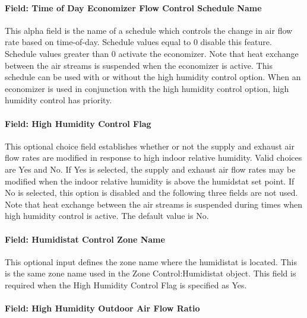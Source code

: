 \paragraph{Field: Time of Day Economizer Flow Control Schedule Name}\label{field-time-of-day-economizer-flow-control-schedule-name}

This alpha field is the name of a schedule which controls the change in air flow rate based on time-of-day. Schedule values equal to 0 disable this feature. Schedule values greater than 0 activate the economizer. Note that heat exchange between the air streams is suspended when the economizer is active. This schedule can be used with or without the high humidity control option. When an economizer is used in conjunction with the high humidity control option, high humidity control has priority.

\paragraph{Field: High Humidity Control Flag}\label{field-high-humidity-control-flag}

This optional choice field establishes whether or not the supply and exhaust air flow rates are modified in response to high indoor relative humidity. Valid choices are Yes and No. If Yes is selected, the supply and exhaust air flow rates may be modified when the indoor relative humidity is above the humidstat set point. If No is selected, this option is disabled and the following three fields are not used. Note that heat exchange between the air streams is suspended during times when high humidity control is active. The default value is No.

\paragraph{Field: Humidistat Control Zone Name}\label{field-humidistat-control-zone-name-1}

This optional input defines the zone name where the humidistat is located. This is the same zone name used in the Zone Control:Humidistat object. This field is required when the High Humidity Control Flag is specified as Yes.

\paragraph{Field: High Humidity Outdoor Air Flow Ratio}\label{field-high-humidity-outdoor-air-flow-ratio-1}

